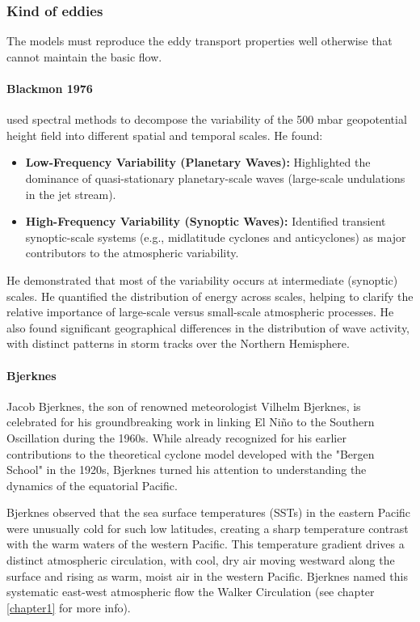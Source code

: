 \subsubsection{Kind of eddies}
The models must reproduce the eddy transport properties well otherwise that cannot maintain the basic flow.
\paragraph{Blackmon 1976}\cite{M.L.Blackmon1976}  used spectral methods to decompose the variability of the 500 mbar geopotential height field into different spatial and temporal scales. He found:
\begin{itemize}
	\item \textbf{Low-Frequency Variability (Planetary Waves):} Highlighted the dominance of quasi-stationary planetary-scale waves (large-scale undulations in the jet stream).
	\item \textbf{High-Frequency Variability (Synoptic Waves):} Identified transient synoptic-scale systems (e.g., midlatitude cyclones and anticyclones) as major contributors to the atmospheric variability.
\end{itemize}
He demonstrated that most of the variability occurs at intermediate (synoptic) scales. He quantified the distribution of energy across scales, helping to clarify the relative importance of large-scale versus small-scale atmospheric processes. He also found significant geographical differences in the distribution of wave activity, with distinct patterns in storm tracks over the Northern Hemisphere.

\paragraph{Bjerknes} Jacob Bjerknes, the son of renowned meteorologist Vilhelm Bjerknes, is celebrated for his groundbreaking work in linking El Niño to the Southern Oscillation during the 1960s. While already recognized for his earlier contributions to the theoretical cyclone model developed with the "Bergen School" in the 1920s, Bjerknes turned his attention to understanding the dynamics of the equatorial Pacific.

Bjerknes observed that the sea surface temperatures (SSTs) in the eastern Pacific were unusually cold for such low latitudes, creating a sharp temperature contrast with the warm waters of the western Pacific. This temperature gradient drives a distinct atmospheric circulation, with cool, dry air moving westward along the surface and rising as warm, moist air in the western Pacific. Bjerknes named this systematic east-west atmospheric flow the Walker Circulation (see chapter \ref{chapter1} for more info).

